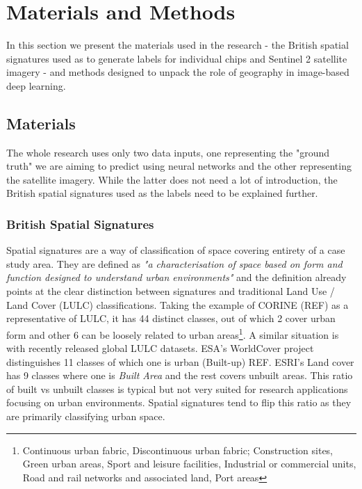 \section{Materials and Methods}
\label{sec:matmet}

In this section we present the materials used in the research - the British spatial signatures used as to generate labels for individual chips and Sentinel 2 satellite imagery - and methods designed to unpack the role of geography in image-based deep learning.

\subsection{Materials}

The whole research uses only two data inputs, one representing the "ground truth" we are aiming to predict using neural networks and the other representing the satellite imagery. While the latter does not need a lot of introduction, the British spatial signatures used as the labels need to be explained further.

\subsubsection{British Spatial Signatures}

Spatial signatures are a way of classification of space covering entirety of a case study area. They are defined as \textit{"a characterisation of space based on form and function designed to understand urban environments"} \citep{dab_mf_2021a} and the definition already points at the clear distinction between signatures and traditional Land Use / Land Cover (LULC) classifications. Taking the example of CORINE (REF) as a representative of LULC, it has 44 distinct classes, out of which 2 cover urban form and other 6 can be loosely related to urban areas\footnote{Continuous urban fabric, Discontinuous urban fabric; Construction sites, Green urban areas, Sport and leisure facilities, Industrial or commercial units, Road and rail networks and associated land, Port areas}. A similar situation is with recently released global LULC datasets. ESA's WorldCover project distinguishes 11 classes of which one is urban (Built-up) REF. ESRI's Land cover has 9 classes where one is \textit{Built Area} and the rest covers unbuilt areas. This ratio of built vs unbuilt classes is typical but not very suited for research applications focusing on urban environments. Spatial signatures tend to flip this ratio as they are primarily classifying urban space.


